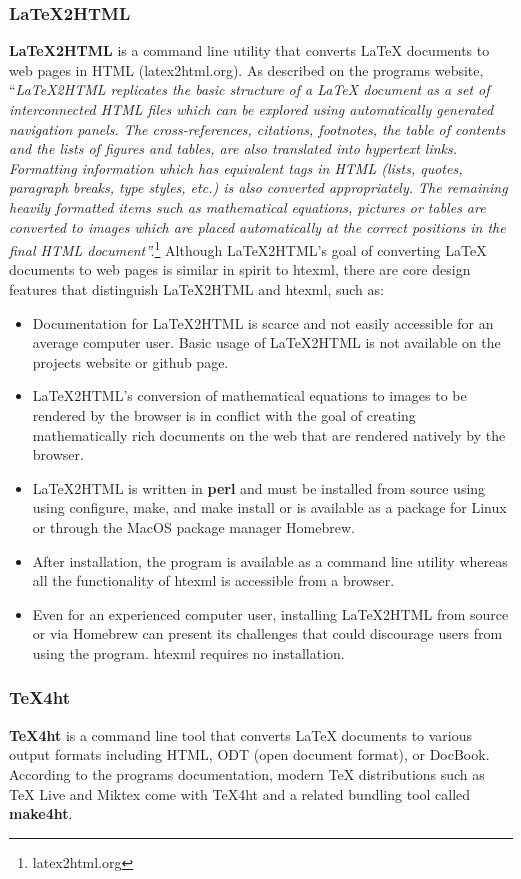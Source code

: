 \documentclass[11pt]{article}
\theoremstyle{theorem}
\theoremstyle{definition}
\begin{document}
\subsubsection{LaTeX2HTML}
\textbf{LaTeX2HTML} is a command line utility that converts LaTeX documents to web pages in HTML (latex2html.org).  As described on the programs website, ``\textit{LaTeX2HTML replicates the basic structure of a LaTeX document as a set of interconnected HTML files which can be explored using automatically generated navigation panels. The cross-references, citations, footnotes, the table of contents and the lists of figures and tables, are also translated into hypertext links. Formatting information which has equivalent tags in HTML (lists, quotes, paragraph breaks, type styles, etc.) is also converted appropriately. The remaining heavily formatted items such as mathematical equations, pictures or tables are converted to images which are placed automatically at the correct positions in the final HTML document''.}\footnote{latex2html.org}  Although LaTeX2HTML's goal of converting LaTeX documents to web pages is similar in spirit to htexml, there are core design features that distinguish LaTeX2HTML and htexml, such as:

\begin{itemize}
\item Documentation for LaTeX2HTML is scarce and not easily accessible for an average computer user.  Basic usage of LaTeX2HTML is not available on the projects website or github page.
\item LaTeX2HTML's conversion of mathematical equations to images to be rendered by the browser is in conflict with the goal of creating mathematically rich documents on the web that are rendered natively by the browser.
\item LaTeX2HTML is written in \textbf{perl} and must be installed from source using using configure, make, and make install or is available as a package for Linux or through the MacOS package manager Homebrew.
\item After installation, the program is available as a command line utility whereas all the functionality of htexml is accessible from a browser.
\item Even for an experienced computer user, installing LaTeX2HTML from source or via Homebrew can present its challenges that could discourage users from using the program.  htexml requires no installation.
\end{itemize}

\subsubsection{TeX4ht}
\textbf{TeX4ht} is a command line tool that converts LaTeX documents to various output formats including HTML, ODT (open document format), or DocBook.  According to the programs documentation, modern TeX distributions such as TeX Live and Miktex come with TeX4ht and a related bundling tool called \textbf{make4ht}.  
\end{document}
